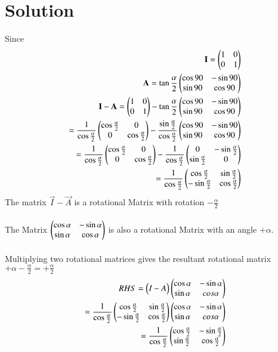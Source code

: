 \documentclass[journal,12pt,twocolumncolumn]{IEEEtran}
\begin{document}
\section{\textbf{Solution}}
Since
\begin{align}
    \vec{I}=\myvec{1 & 0\\ 0 & 1}\\
    \vec{A}=\tan\frac{\alpha}{2}\myvec{\cos{90} & -\sin{90} \\ \sin{90} & \cos{90}}\\
\Vec{I}-\Vec{A}=\myvec{1 & 0\\ 0 & 1}-\tan\frac{\alpha}{2}\myvec{\cos{90} & -\sin{90} \\ \sin{90} & \cos{90}}\\
=\frac{1}{\cos\frac{\alpha}{2}}\myvec{\cos\frac{\alpha}{2} & 0 \\ 0 & \cos\frac{\alpha}{2}}-\frac{\sin\frac{\alpha}{2}}{\cos\frac{\alpha}{2}}\myvec{\cos{90} & -\sin{90} \\ \sin{90} & \cos{90}} \\
=\frac{1}{\cos\frac{\alpha}{2}}\myvec{\cos\frac{\alpha}{2} & 0 \\ 0 & \cos\frac{\alpha}{2}}-\frac{1}{\cos\frac{\alpha}{2}}\myvec{0 & -\sin\frac{\alpha}{2} \\ \sin\frac{\alpha}{2} & 0} \\
=\frac{1}{\cos\frac{\alpha}{2}}\myvec{\cos\frac{\alpha}{2} & \sin\frac{\alpha}{2} \\ -\sin\frac{\alpha}{2} & \cos\frac{\alpha}{2}}
\end{align}
The matrix $\vec{I}-\vec{A}$ is a rotational Matrix with rotation $-\frac{\alpha}{2}$ \\\\
The Matrix $\begin{pmatrix}\cos\alpha & -\sin\alpha \\ \sin\alpha & \cos\alpha\end{pmatrix}$ is also a rotational Matrix with an angle $+\alpha$.\\\\
Multiplying two rotational matrices gives the resultant rotational matrix $+\alpha-\frac{\alpha}{2}=+\frac{\alpha}{2}$\\
\begin{align}
  RHS=\begin{pmatrix}I-A\end{pmatrix}\begin{pmatrix}\cos\alpha & -\sin\alpha \\ \sin\alpha & cos\alpha\end{pmatrix}\\
 =\frac{1}{\cos\frac{\alpha}{2}}\begin{pmatrix}\cos\frac{\alpha}{2} & \sin\frac{\alpha}{2} \\ -\sin\frac{\alpha}{2} & \cos\frac{\alpha}{2}\end{pmatrix}\begin{pmatrix}\cos\alpha & -\sin\alpha \\ \sin\alpha & cos\alpha\end{pmatrix}\\
   =\frac{1}{\cos\frac{\alpha}{2}}\begin{pmatrix}\cos\frac{\alpha}{2} & -\sin\frac{\alpha}{2} \\ \sin\frac{\alpha}{2} & \cos\frac{\alpha}{2}\end{pmatrix}\\
\end{align}
\end{document}
